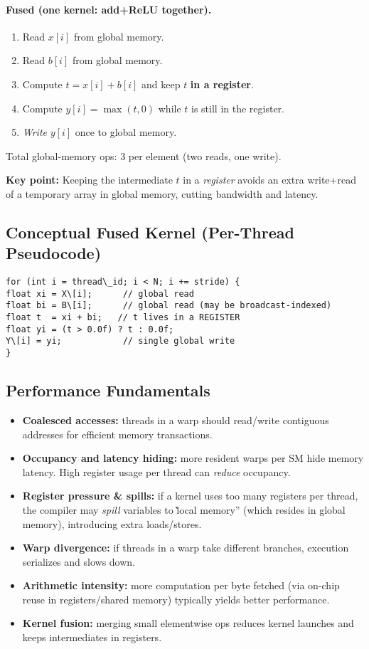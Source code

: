 \paragraph{Fused (one kernel: add+ReLU together).}
\begin{enumerate}
\item Read $x[i]$ from global memory.
\item Read $b[i]$ from global memory.
\item Compute $t = x[i] + b[i]$ and keep $t$ \textbf{in a register}.
\item Compute $y[i] = \max(t, 0)$ while $t$ is still in the register.
\item \emph{Write} $y[i]$ once to global memory.
\end{enumerate}
Total global-memory ops: $3$ per element (two reads, one write).

\noindent\textbf{Key point:} Keeping the intermediate $t$ in a \emph{register} avoids an extra write+read of a temporary array in global memory, cutting bandwidth and latency.

\subsection{Conceptual Fused Kernel (Per-Thread Pseudocode)}
\begin{verbatim}
for (int i = thread\_id; i < N; i += stride) {
float xi = X\[i];      // global read
float bi = B\[i];      // global read (may be broadcast-indexed)
float t  = xi + bi;   // t lives in a REGISTER
float yi = (t > 0.0f) ? t : 0.0f;
Y\[i] = yi;            // single global write
}
\end{verbatim}

\subsection{Performance Fundamentals}
\begin{itemize}
\item \textbf{Coalesced accesses:} threads in a warp should read/write contiguous addresses for efficient memory transactions.
\item \textbf{Occupancy and latency hiding:} more resident warps per SM hide memory latency. High register usage per thread can \emph{reduce} occupancy.
\item \textbf{Register pressure & spills:} if a kernel uses too many registers per thread, the compiler may \emph{spill} variables to \`\`local memory'' (which resides in global memory), introducing extra loads/stores.
\item \textbf{Warp divergence:} if threads in a warp take different branches, execution serializes and slows down.
\item \textbf{Arithmetic intensity:} more computation per byte fetched (via on-chip reuse in registers/shared memory) typically yields better performance.
\item \textbf{Kernel fusion:} merging small elementwise ops reduces kernel launches and keeps intermediates in registers.
\end{itemize}

